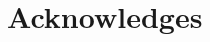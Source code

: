 \documentclass{llncs}
\begin{document}
\section*{Acknowledges}
%
%
\begin{thebibliography}{}
%


\end{thebibliography}
%
\end{document}
